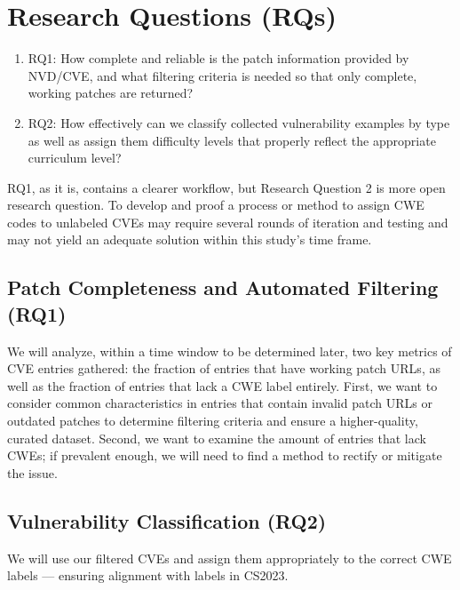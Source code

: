 \section{Research Questions (RQs)}
\done{}

\begin{enumerate}
    \item RQ1: How complete and reliable is the patch information provided by NVD/CVE, and what filtering criteria is needed so that only complete, working patches are returned?
    
    \item RQ2: How effectively can we classify collected vulnerability examples by type as well as assign them difficulty levels that properly reflect the appropriate curriculum level?
\end{enumerate}

RQ1, as it is, contains a clearer workflow, but Research Question 2 is more open research question. To develop and proof a process or method to assign CWE codes to unlabeled CVEs may require several rounds of iteration and testing and may not yield an adequate solution within this study's time frame. 

\subsection{Patch Completeness and Automated Filtering (RQ1)}
We will analyze, within a time window to be determined later, two key metrics of CVE entries gathered: the fraction of entries that have working patch URLs, as well as the fraction of entries that lack a CWE label entirely. First, we want to consider common characteristics in entries that contain invalid patch URLs or outdated patches to determine filtering criteria and ensure a higher-quality, curated dataset. Second, we want to examine the amount of entries that lack CWEs; if prevalent enough, we will need to find a method to rectify or mitigate the issue.
\subsection{Vulnerability Classification (RQ2)}
We will use our filtered CVEs and assign them appropriately to the correct CWE labels — ensuring alignment with labels in CS2023. 


